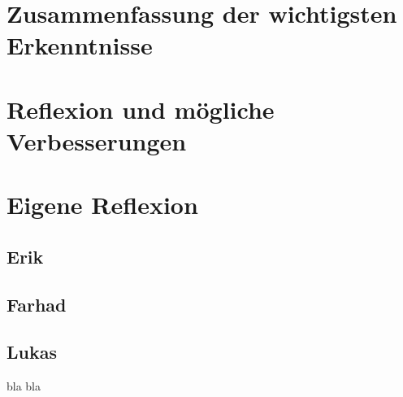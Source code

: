 
\section{Zusammenfassung der wichtigsten Erkenntnisse}
\section{Reflexion und mögliche Verbesserungen}
\section{Eigene Reflexion}
\subsection{Erik}
\subsection{Farhad}
\subsection{Lukas}
bla bla
\clearpage